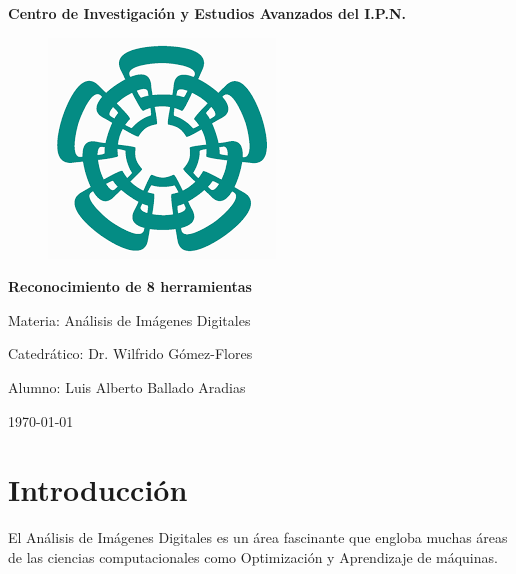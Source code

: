 \documentclass[a4paper, 11pt]{article}
\renewcommand\lstlistlistingname{Códigos}
\begin{document}

\begin{titlepage}
  \clearpage\thispagestyle{empty}
  \centering
  \vspace{1cm}
  {\Huge \textbf{Centro de Investigación y Estudios Avanzados del I.P.N.} \par}
  \vspace{1cm}

  \begin{figure}[h!]
    \centering
    \includegraphics[scale=0.5]{cinves.png}
  \end{figure}
    
  \vspace{1cm}
  {\Huge \textbf{Reconocimiento de 8 herramientas}\par} 
  \vspace{4cm}
  {\Large Materia: Análisis de Imágenes Digitales \par} 
  \vspace{3cm}
  {\Large Catedrático: Dr. Wilfrido Gómez-Flores \par} 
  \vspace{1cm}
  {\Large Alumno: Luis Alberto Ballado Aradias \par} 
  
  \vspace{3cm}
  {\normalsize \today \par}
\end{titlepage}

\tableofcontents{}

\renewcommand\lstlistlistingname{Lista de códigos}
\lstlistoflistings

\pagebreak

\section{Introducción}

El Análisis de Imágenes Digitales es un área fascinante que engloba muchas áreas de las ciencias computacionales como Optimización y Aprendizaje de máquinas.\\
\end{document}
